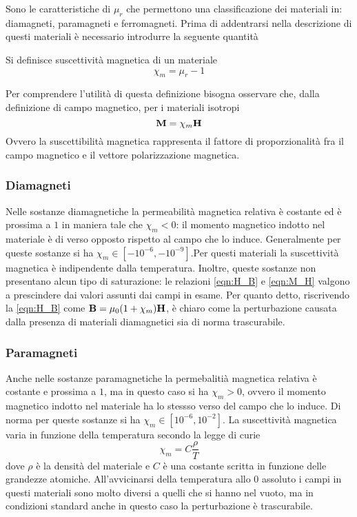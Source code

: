 Sono le caratteristiche di $\mu_r$ che permettono una classificazione dei materiali in:
diamagneti, paramagneti e ferromagneti.
Prima di addentrarsi nella descrizione di questi materiali è necessario introdurre la seguente quantità
\begin{defn}
    Si definisce suscettività magnetica di un materiale
    \[
        \chi_m=\mu_r-1
    \]
\end{defn}
Per comprendere l'utilità di questa definizione bisogna osservare che, dalla definizione di campo magnetico,
per i materiali isotropi
\begin{equation}
    \vb{M}=\chi_m\vb{H}
    \label{eqn:M_H}
\end{equation}
Ovvero la suscettibilità magnetica rappresenta il fattore di proporzionalità fra il campo magnetico e
il vettore polarizzazione magnetica.


\subsubsection{Diamagneti}
Nelle sostanze diamagnetiche la permeabilità magnetica relativa è costante ed è prossima a $1$ in maniera tale che
$\chi_m<0$: il momento magnetico indotto nel materiale è di verso opposto rispetto al campo che lo induce. Generalmente
per queste sostanze si ha $\chi_m \in [-10^{-6},-10^{-9}]$.Per questi materiali
la suscettività magnetica è indipendente dalla temperatura. Inoltre, queste sostanze non presentano alcun tipo di
saturazione: le relazioni \eqref{eqn:H_B} e \eqref{eqn:M_H} valgono a prescindere dai valori assunti dai campi in esame.
Per quanto detto, riscrivendo la \eqref{eqn:H_B} come $\vb{B}=\mu_0(1+\chi_m)\vb{H}$, è chiaro come la perturbazione
causata dalla presenza di materiali diamagnetici sia di norma trascurabile.

\subsubsection{Paramagneti}
Anche nelle sostanze paramagnetiche la permebalitià magnetica relativa è costante e prossima a $1$, ma in questo caso
si ha $\chi_m>0$, ovvero il momento magnetico indotto nel materiale ha lo stessso verso del campo che lo induce.
Di norma per queste sostanze si ha $\chi_m \in [10^{-6},10^{-2}]$. La suscettività magnetica varia in funzione della
temperatura secondo la legge di curie
\begin{equation}
    \chi_m=C\frac{\rho}{T}
\end{equation}
dove $\rho$ è la densità del materiale e $C$ è una costante scritta in funzione delle grandezze atomiche.
All'avvicinarsi della temperatura allo 0 assoluto i campi in questi materiali sono molto diversi a quelli che
si hanno nel vuoto, ma in condizioni standard anche in questo caso la perturbazione è trascurabile.

